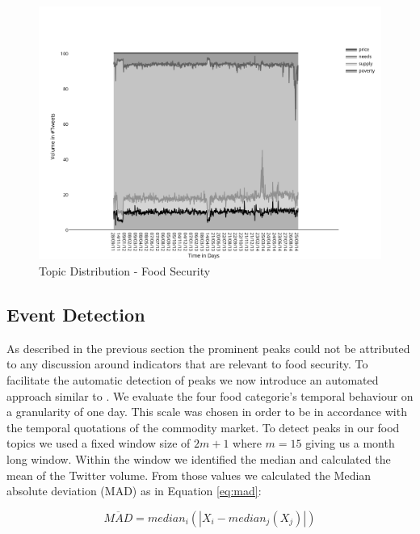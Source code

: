 \begin{figure}[H]
        \centering
         \includegraphics[width=1\textwidth ]{img/anal/topic_dist}
              
        \caption{Topic Distribution - Food Security}
        \label{fig:topic_dist}
\end{figure}




\subsection{Event Detection} 

As described in the previous section the prominent peaks could not be attributed to any discussion around indicators that are relevant to food security. To facilitate the automatic detection of peaks we now introduce an automated approach similar to\cite{olt15} \cite{Lehmann2012}. We evaluate the four food categorie's temporal behaviour on a granularity of one day. This scale was chosen in order to be in accordance with the temporal quotations of the commodity market. To detect peaks in our food topics we used a fixed window size of $2m + 1$  where $m = 15$ giving us a month long window. Within the window we identified the median and calculated the mean of the Twitter volume. From those values we calculated the Median absolute deviation (MAD) as in Equation \ref{eq:mad}: 

\begin{equation} \label{eq:mad}
\overline{ MAD } = median_i (|X_i - median_j(X_j)|)\end{equation}


